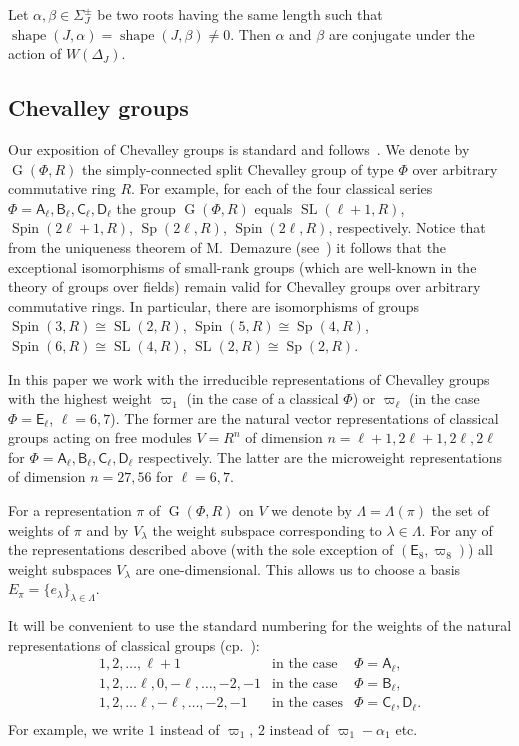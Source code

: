 \documentclass[12pt]{amsart}
\numberwithin{equation}{section}
\theoremstyle{definition}
\DeclareMathOperator{\G}{G}
\DeclareMathOperator{\SL}{SL}
\DeclareMathOperator{\Sp}{Sp}
\DeclareMathOperator{\shape}{shape}
\DeclareMathOperator{\Spin}{Spin}
\newcommand{\rA}{\mathsf{A}}
\newcommand{\rB}{\mathsf{B}}
\newcommand{\rC}{\mathsf{C}}
\newcommand{\rD}{\mathsf{D}}
\newcommand{\rE}{\mathsf{E}}
\begin{document}
\begin{lemma}\label{lemma:abs}
Let $\alpha, \beta \in \Sigma^\pm_J$ be two roots having the same length such that $\shape(J,\alpha)=\shape(J,\beta)\neq 0$.
Then $\alpha$ and $\beta$ are conjugate under the action of $W(\Delta_J)$.
\end{lemma}

\subsection{Chevalley groups}
Our exposition of Chevalley groups is standard and follows~\cite{Ta, S, St78, VP, Va86}.
We denote by $\G(\Phi, R)$ the simply-connected split Chevalley group of type $\Phi$ over arbitrary commutative ring $R$. For example, for each of the four classical series $\Phi=\rA_\ell, \rB_\ell, \rC_\ell, \rD_\ell$
the group $\G(\Phi, R)$ equals $\SL(\ell+1, R)$, $\Spin(2\ell+1, R)$, $\Sp(2\ell, R)$, $\Spin(2\ell, R)$, respectively. Notice that from the uniqueness theorem of M.~Demazure (see~\cite[Corollaire~5.2]{SGA3}) 
it follows that the exceptional isomorphisms of small-rank groups (which are well-known in the theory of groups over fields) remain valid for Chevalley groups over arbitrary commutative rings.
In particular, there are isomorphisms of groups $\Spin(3,R)\cong\SL(2,R)$, $\Spin(5, R)\cong \Sp(4, R)$, $\Spin(6, R)\cong\SL(4, R)$, $\SL(2, R)\cong \Sp(2, R)$.  

In this paper we work with the irreducible representations of Chevalley groups with the highest weight
$\varpi_1$ (in the case of a classical $\Phi$) or $\varpi_\ell$ (in the case $\Phi=\rE_\ell$, $\ell=6,7$). The former are the natural vector representations of classical groups acting on free modules $V=R^n$ of dimension $n=\ell+1, 2\ell+1, 2\ell,2\ell$ for $\Phi=\rA_\ell,\rB_\ell,\rC_\ell,\rD_\ell$ respectively.
The latter are the microweight representations of dimension $n=27, 56$ for $\ell=6,7$.

For a representation $\pi$ of $\G(\Phi, R)$ on $V$ we denote by $\Lambda=\Lambda(\pi)$ the set of weights of $\pi$ and by $V_\lambda$ the weight subspace corresponding to $\lambda\in\Lambda$.
For any of the representations described above (with the sole exception of $(\rE_8, \varpi_8)$) all weight subspaces $V_\lambda$ are one-dimensional. 
This allows us to choose a basis $E_\pi=\{e_\lambda\}_{\lambda\in\Lambda}$.

It will be convenient to use the standard numbering for the weights of the natural representations of classical groups (cp.~\cite[§1B]{St78}):
\[\begin{array}{cll}
  1,2,\ldots, \ell+1 & \text{in the case} & \Phi =\rA_\ell, \\
  1,2,\ldots \ell, 0, -\ell,\ldots, -2, -1 & \text{in the case} & \Phi =\rB_\ell, \\
  1,2,\ldots \ell, -\ell,\ldots, -2, -1 & \text{in the cases}   & \Phi =\rC_\ell, \rD_\ell. \\
\end{array}\]
For example, we write $1$ instead of $\varpi_1$, $2$ instead of $\varpi_1-\alpha_1$ etc.
\end{document}

